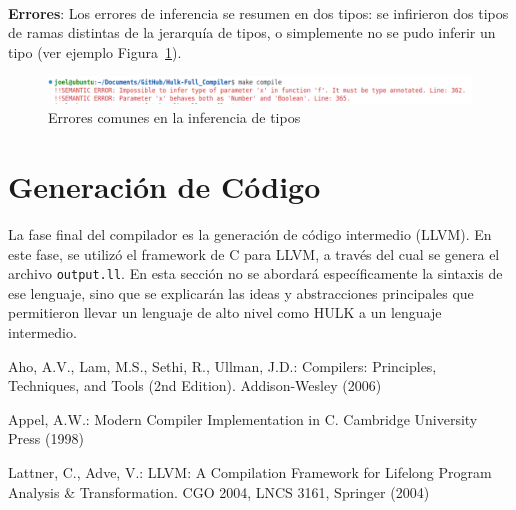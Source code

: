 \documentclass{llncs}
\begin{document}
\  

\textbf{Errores}: Los errores de inferencia se resumen en dos tipos: se infirieron dos tipos de ramas distintas de la jerarquía de tipos, o simplemente no se pudo inferir un tipo (ver ejemplo Figura~\ref{fig:errores_6}).
\begin{figure}[h]
\centering
\includegraphics[width=1\textwidth]{images/inference_errors.png}
\caption{Errores comunes en la inferencia de tipos}
\label{fig:errores_6}
\end{figure}

\vspace{10pt}
\section{Generación de Código}

La fase final del compilador es la generación de código intermedio (LLVM). En este fase, se utilizó el framework de C para LLVM, a través del cual se genera el archivo \texttt{output.ll}. En esta sección no se abordará específicamente la sintaxis de ese lenguaje, sino que se explicarán las ideas y abstracciones principales que permitieron llevar 
un lenguaje de alto nivel como HULK a un lenguaje intermedio. 
\vspace{10pt}
\begin{thebibliography}{9}
Aho, A.V., Lam, M.S., Sethi, R., Ullman, J.D.: 
Compilers: Principles, Techniques, and Tools (2nd Edition). 
Addison-Wesley (2006)

Appel, A.W.: Modern Compiler Implementation in C. 
Cambridge University Press (1998)

Lattner, C., Adve, V.: 
LLVM: A Compilation Framework for Lifelong Program Analysis \& Transformation. 
CGO 2004, LNCS 3161, Springer (2004)
\end{thebibliography}
\end{document}
